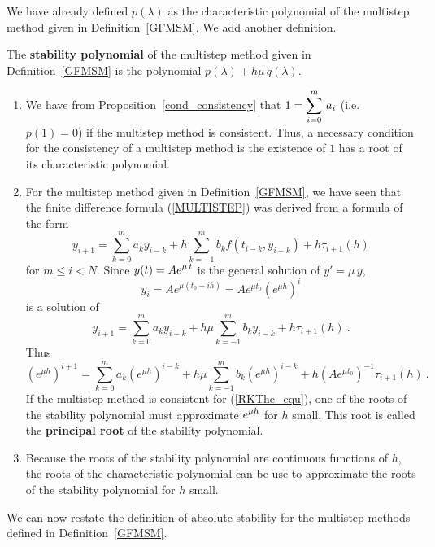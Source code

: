 We have already defined $p(\lambda)$ as the characteristic polynomial
 of the multistep method given in
Definition~\ref{GFMSM}.  We add another definition.

\begin{defn}
The {\bfseries stability polynomial} of the
multistep method given in Definition~\ref{GFMSM}
is the polynomial $p(\lambda) + h\mu\, q(\lambda)$.
\end{defn}

\begin{rmkList}
\begin{enumerate}
\item We have from Proposition~\ref{cond_consistency} that
$\displaystyle 1 = \sum_{i=0}^m\,a_i$ (i.e.\ $p(1) = 0$) if the
multistep method is consistent.  Thus, a necessary condition for the
consistency of a multistep method is the existence of $1$ has a root
of its characteristic polynomial.
\item For the multistep method given in Definition~\ref{GFMSM}, we have
seen that the finite difference formula (\ref{MULTISTEP}) was derived
from a formula of the form
\[
y_{i+1} = \sum_{k=0}^m a_k y_{i-k} + h \sum_{k=-1}^m b_k
f(t_{i-k},y_{i-k}) + h \tau_{i+1}(h)
\]
for $m \leq i < N$.  Since $\displaystyle y(t) = A e^{\mu\, t}$ is the
general solution of $y' = \mu\,y$,
\[
y_i = A e^{\mu (t_0+ih)} = A e^{\mu t_0} \left( e^{\mu h}\right)^i
\]
is a solution of
\[
y_{i+1} = \sum_{k=0}^m a_k y_{i-k} + h \mu \sum_{k=-1}^m b_k
y_{i-k} + h \tau_{i+1}(h) \ .
\]
Thus
\[
\left( e^{\mu h}\right)^{i+1} = \sum_{k=0}^m a_k \left( e^{\mu h}\right)^{i-k}
+ h \mu \sum_{k=-1}^m b_k \left( e^{\mu h}\right)^{i-k}
+ h \left(A e^{\mu t_0}\right)^{-1} \tau_{i+1}(h) \ .
\]
If the multistep method is consistent for (\ref{RKThe_equ}), one of
the roots of the stability polynomial must approximate
$\displaystyle e^{\mu h}$ for $h$ small.  This root is called the
{\bfseries principal root} of
the stability polynomial. 
\item Because the roots of the stability polynomial are continuous
functions of $h$, the roots of the characteristic polynomial can be
use to approximate the roots of the stability polynomial for $h$
small.
\end{enumerate}
\end{rmkList}

We can now restate the definition of absolute stability for the
multistep methods defined in Definition~\ref{GFMSM}.

